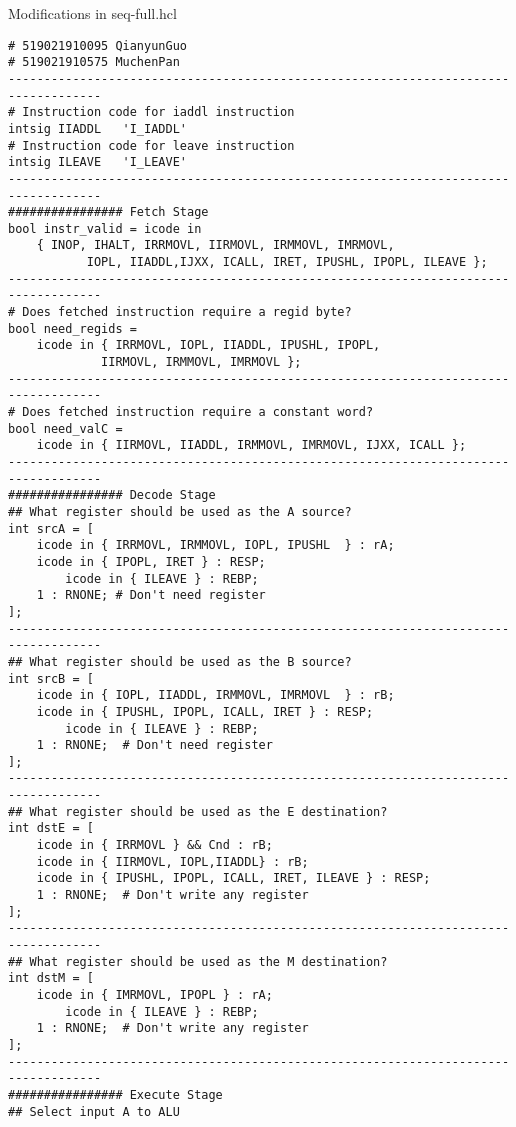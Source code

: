 \documentclass{article}
\begin{document}
\begin{center}
Modifications in {\ttfamily seq-full.hcl}
\end{center}
\begin{lstlisting}[language={[x86masm]Assembler}]
# 519021910095 QianyunGuo
# 519021910575 MuchenPan
-----------------------------------------------------------------------------------
# Instruction code for iaddl instruction
intsig IIADDL	'I_IADDL'
# Instruction code for leave instruction
intsig ILEAVE   'I_LEAVE'
-----------------------------------------------------------------------------------
################ Fetch Stage 
bool instr_valid = icode in 
	{ INOP, IHALT, IRRMOVL, IIRMOVL, IRMMOVL, IMRMOVL,
	       IOPL, IIADDL,IJXX, ICALL, IRET, IPUSHL, IPOPL, ILEAVE };
-----------------------------------------------------------------------------------
# Does fetched instruction require a regid byte?
bool need_regids =
	icode in { IRRMOVL, IOPL, IIADDL, IPUSHL, IPOPL, 
		     IIRMOVL, IRMMOVL, IMRMOVL };
-----------------------------------------------------------------------------------
# Does fetched instruction require a constant word?
bool need_valC =
	icode in { IIRMOVL, IIADDL, IRMMOVL, IMRMOVL, IJXX, ICALL };
-----------------------------------------------------------------------------------
################ Decode Stage
## What register should be used as the A source?
int srcA = [
	icode in { IRRMOVL, IRMMOVL, IOPL, IPUSHL  } : rA;
	icode in { IPOPL, IRET } : RESP;
        icode in { ILEAVE } : REBP;
	1 : RNONE; # Don't need register
];
-----------------------------------------------------------------------------------
## What register should be used as the B source?
int srcB = [
	icode in { IOPL, IIADDL, IRMMOVL, IMRMOVL  } : rB;
	icode in { IPUSHL, IPOPL, ICALL, IRET } : RESP;
        icode in { ILEAVE } : REBP;
	1 : RNONE;  # Don't need register
];
-----------------------------------------------------------------------------------
## What register should be used as the E destination?
int dstE = [
	icode in { IRRMOVL } && Cnd : rB;
	icode in { IIRMOVL, IOPL,IIADDL} : rB;
	icode in { IPUSHL, IPOPL, ICALL, IRET, ILEAVE } : RESP;
	1 : RNONE;  # Don't write any register
];
-----------------------------------------------------------------------------------
## What register should be used as the M destination?
int dstM = [
	icode in { IMRMOVL, IPOPL } : rA;
        icode in { ILEAVE } : REBP;
	1 : RNONE;  # Don't write any register
];
-----------------------------------------------------------------------------------
################ Execute Stage
## Select input A to ALU

\end{lstlisting}
\end{document}
